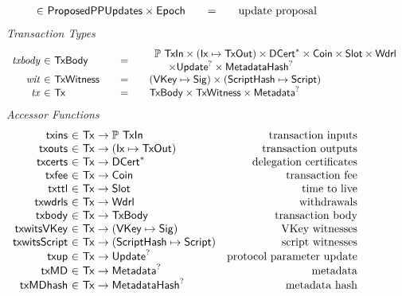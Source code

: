 \begin{figure*}[htb]
\begin{equation*}
\begin{array}{r@{~\in~}l@{\qquad=\qquad}lr}
      & \ProposedPPUpdates \times \Epoch
      & \text{update proposal}
    \end{array}
  \end{equation*}
  \emph{Transaction Types}
  \begin{equation*}
    \begin{array}{r@{~\in~}l@{\qquad=\qquad}l}
      \var{txbody}
      & \TxBody
      & \begin{array}{l}
        \powerset{\TxIn} \times (\Ix \mapsto \TxOut) \times \seqof{\DCert}
        \times \Coin \times \Slot \times \Wdrl
        \\ ~~~~\times \Update^? \times \MetadataHash^?
        \end{array}
      \\
      \var{wit} & \TxWitness & (\VKey \mapsto \Sig) \times (\HashScr \mapsto \Script)
      \\
      \var{tx}
      & \Tx
      & \TxBody \times \TxWitness \times \Metadata^?
    \end{array}
  \end{equation*}
  \emph{Accessor Functions}
  \begin{equation*}
    \begin{array}{r@{~\in~}lr}
      \fun{txins} & \Tx \to \powerset{\TxIn} & \text{transaction inputs} \\
      \fun{txouts} & \Tx \to (\Ix \mapsto \TxOut) & \text{transaction outputs} \\
      \fun{txcerts} & \Tx \to \seqof{\DCert} & \text{delegation certificates} \\
      \fun{txfee} & \Tx \to \Coin & \text{transaction fee} \\
      \fun{txttl} & \Tx \to \Slot & \text{time to live} \\
      \fun{txwdrls} & \Tx \to \Wdrl & \text{withdrawals} \\
      \fun{txbody} & \Tx \to \TxBody & \text{transaction body}\\
      \fun{txwitsVKey} & \Tx \to (\VKey \mapsto \Sig) & \text{VKey witnesses} \\
      \fun{txwitsScript} & \Tx \to (\HashScr \mapsto \Script) & \text{script witnesses}\\
      \fun{txup} & \Tx \to \Update^? & \text{protocol parameter update}\\
      \fun{txMD} & \Tx \to \Metadata^? & \text{metadata}\\
      \fun{txMDhash} & \Tx \to \MetadataHash^? & \text{metadata hash}\\

\end{array}
\end{equation*}
\end{figure*}
